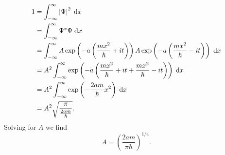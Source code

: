 \documentclass[a4paper, 12pt]{config/homework}
\begin{document}
\begin{enumerate}
\begin{enumerate}[label = (\alph*)]
\begin{align*}
1 &= \bint{-\infty}{\infty}{\left|\Psi\right|^2}{x}
\\&= \bint{-\infty}{\infty}{\Psi^* \Psi}{x}
\\&= \bint{-\infty}{\infty}{A\exp\left(-a\left(\frac{mx^2}{\hbar}+it\right)\right) A\exp\left(-a\left(\frac{mx^2}{\hbar}-it\right)\right)}{x}
\\&= A^2 \bint{-\infty}{\infty}{\exp\left(-a\left(\frac{mx^2}{\hbar} + it + \frac{mx^2}{\hbar} - it\right)\right)}{x}
\\&= A^2 \bint{-\infty}{\infty}{\exp\left(-\frac{2am}{\hbar}x^2\right)}{x}
\\&= A^2 \sqrt{\frac{\pi}{\frac{2am}{\hbar}}}.
\end{align*}
Solving for \(A\) we find
\[A = {\left(\frac{2am}{\pi \hbar}\right)}^{1/4}.\]


\end{enumerate}
\end{enumerate}
\end{document}
